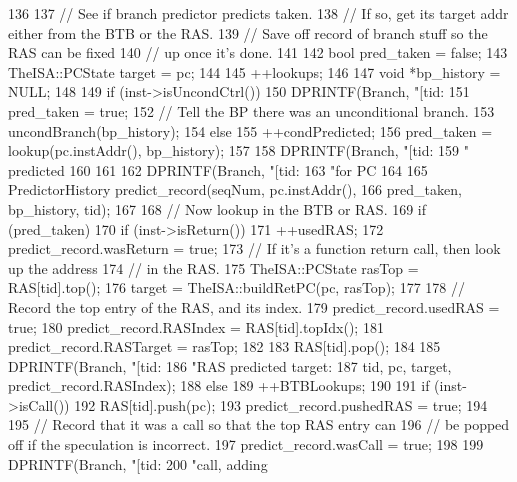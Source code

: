 \begin{DoxyCode}
136 {
137     // See if branch predictor predicts taken.
138     // If so, get its target addr either from the BTB or the RAS.
139     // Save off record of branch stuff so the RAS can be fixed
140     // up once it's done.
141 
142     bool pred_taken = false;
143     TheISA::PCState target = pc;
144 
145     ++lookups;
146 
147     void *bp_history = NULL;
148 
149     if (inst->isUncondCtrl()) {
150         DPRINTF(Branch, "[tid:%
151         pred_taken = true;
152         // Tell the BP there was an unconditional branch.
153         uncondBranch(bp_history);
154     } else {
155         ++condPredicted;
156         pred_taken = lookup(pc.instAddr(), bp_history);
157 
158         DPRINTF(Branch, "[tid:%
159                 " predicted %
160     }
161 
162     DPRINTF(Branch, "[tid:%
163             "for PC %
164 
165     PredictorHistory predict_record(seqNum, pc.instAddr(),
166                                     pred_taken, bp_history, tid);
167 
168     // Now lookup in the BTB or RAS.
169     if (pred_taken) {
170         if (inst->isReturn()) {
171             ++usedRAS;
172             predict_record.wasReturn = true;
173             // If it's a function return call, then look up the address
174             // in the RAS.
175             TheISA::PCState rasTop = RAS[tid].top();
176             target = TheISA::buildRetPC(pc, rasTop);
177 
178             // Record the top entry of the RAS, and its index.
179             predict_record.usedRAS = true;
180             predict_record.RASIndex = RAS[tid].topIdx();
181             predict_record.RASTarget = rasTop;
182 
183             RAS[tid].pop();
184 
185             DPRINTF(Branch, "[tid:%
186                     "RAS predicted target: %
187                     tid, pc, target, predict_record.RASIndex);
188         } else {
189             ++BTBLookups;
190 
191             if (inst->isCall()) {
192                 RAS[tid].push(pc);
193                 predict_record.pushedRAS = true;
194 
195                 // Record that it was a call so that the top RAS entry can
196                 // be popped off if the speculation is incorrect.
197                 predict_record.wasCall = true;
198 
199                 DPRINTF(Branch, "[tid:%
200                         "call, adding %
}}}}
\end{DoxyCode}
